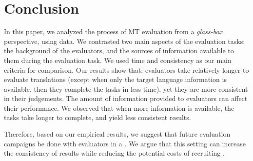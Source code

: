 \documentclass[11pt,a4paper]{article}
\begin{document}
\section{Conclusion}
In this paper, we analyzed the process of MT evaluation from a \emph{glass-box} perspective, using \eye data. We contrasted two main aspects of the evaluation tasks: the background of the evaluators, and the sources of information available to them during the evaluation task.
We used time and consistency as our main criteria for comparison. 
Our results show that: 
\Ni \mono evaluators take relatively longer to evaluate translations (except when only the target language information is available, then they complete the tasks in less time), yet they are more consistent in their judgements. 
\Nii The amount of information provided to evaluators can affect their performance. We observed that when more information is available, the tasks take longer to complete, and yield less consistent results.  



Therefore, based on our empirical results, we suggest that future evaluation campaigns be done with \mono evaluators in a \tgt \gamet. We argue that this setting can increase the consistency of results while reducing the potential costs of recruiting \bils. 
\end{document}
